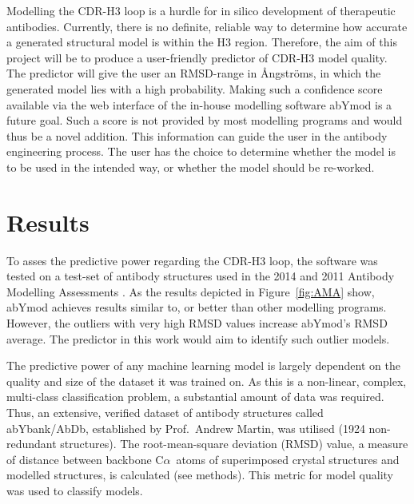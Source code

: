 \documentclass[12pt]{article}
\newcommand{\ca}{\mbox{C$\alpha$}}
\begin{document}
Modelling the CDR-H3 loop is a hurdle for in silico development of
therapeutic antibodies. Currently, there is no definite, reliable way
to determine how accurate a generated structural model is within the
H3 region. Therefore, the aim of this project will be to produce a
user-friendly predictor of CDR-H3 model quality. The predictor will give
the user an RMSD-range in {\AA}ngstr\"{o}ms, in which the generated model lies
with a high probability. Making such a confidence score available via
the web interface of the in-house modelling software abYmod is a
future goal. Such a score is not provided by most modelling programs
and would thus be a novel addition.  This information can guide the
user in the antibody engineering process. The user has the choice to
determine whether the model is to be used in the intended way, or
whether the model should be re-worked.

\section{Results}
To asses the predictive power regarding the CDR-H3 loop, the software
was tested on a test-set of antibody structures used in the 2014 and
2011 Antibody Modelling Assessments
\cite{Almagro2011,Almagro2014}. As the results depicted in
Figure~\ref{fig:AMA} show, abYmod achieves results similar to, or better than
other modelling programs. However, the outliers with very high RMSD
values increase abYmod's RMSD average. The predictor in this work
would aim to identify such outlier models.

The predictive power of any machine learning model is largely
dependent on the quality and size of the dataset it was trained on. As
this is a non-linear, complex, multi-class classification problem, a
substantial amount of data was required. Thus, an extensive, verified
dataset of antibody structures called abYbank/AbDb\cite{XXXX},
established by Prof.\ Andrew Martin, was utilised (1924 non-redundant
structures). The root-mean-square deviation (RMSD) value, a measure of
distance between backbone \ca\ atoms of superimposed crystal structures
and modelled structures, is calculated (see methods). This metric for
model quality was used to classify models.
\end{document}
